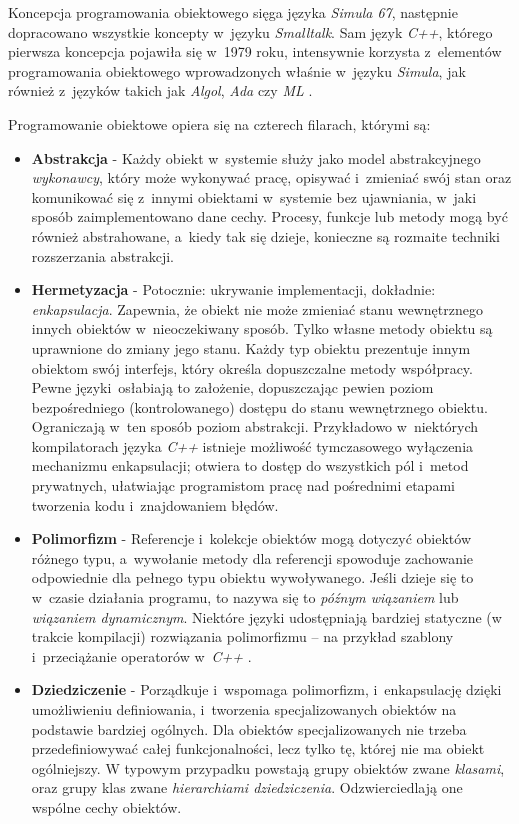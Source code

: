         Koncepcja programowania obiektowego sięga języka \textit{Simula 67}, następnie dopracowano wszystkie koncepty w~języku \textit{Smalltalk}. Sam język \textit{C++}, którego pierwsza koncepcja pojawiła się w~1979 roku, intensywnie korzysta z~elementów programowania obiektowego wprowadzonych właśnie w~języku \textit{Simula}, jak również z~języków takich jak \textit{Algol}, \textit{Ada} czy \textit{ML} \cite{CppStroustrup}.

        Programowanie obiektowe opiera się na czterech filarach, którymi są:
          \begin{itemize}
            \item \textbf{Abstrakcja} - Każdy obiekt w~systemie służy jako model abstrakcyjnego \textit{wykonawcy}, który może wykonywać pracę, opisywać i~zmieniać swój stan oraz komunikować się z~innymi obiektami w~systemie bez ujawniania, w~jaki sposób zaimplementowano dane cechy. Procesy, funkcje lub metody mogą być również abstrahowane, a~kiedy tak się dzieje, konieczne są rozmaite techniki rozszerzania abstrakcji.

            \item \textbf{Hermetyzacja} - Potocznie: ukrywanie implementacji, dokładnie: \textit{enkapsulacja}. Zapewnia, że obiekt nie może zmieniać stanu wewnętrznego innych obiektów w~nieoczekiwany sposób. Tylko własne metody obiektu są uprawnione do zmiany jego stanu. Każdy typ obiektu prezentuje innym obiektom swój interfejs, który określa dopuszczalne metody współpracy. Pewne języki~osłabiają to założenie, dopuszczając pewien poziom bezpośredniego (kontrolowanego) dostępu do stanu wewnętrznego obiektu. Ograniczają w~ten sposób poziom abstrakcji. Przykładowo w~niektórych kompilatorach języka \textit{C++} istnieje możliwość tymczasowego wyłączenia mechanizmu enkapsulacji; otwiera to dostęp do wszystkich pól i~metod prywatnych, ułatwiając programistom pracę nad pośrednimi etapami tworzenia kodu i~znajdowaniem błędów.

            \item \textbf{Polimorfizm} - Referencje i~kolekcje obiektów mogą dotyczyć obiektów różnego typu, a~wywołanie metody dla referencji spowoduje zachowanie odpowiednie dla pełnego typu obiektu wywoływanego. Jeśli dzieje się to w~czasie działania programu, to nazywa się to \textit{późnym wiązaniem} lub \textit{wiązaniem dynamicznym}. Niektóre języki udostępniają bardziej statyczne (w trakcie kompilacji) rozwiązania polimorfizmu – na przykład szablony i~przeciążanie operatorów w~\textit{C++} \cite{CppStroustrup}.

            \item \textbf{Dziedziczenie} - Porządkuje i~wspomaga polimorfizm, i~enkapsulację dzięki umożliwieniu definiowania, i~tworzenia specjalizowanych obiektów na podstawie bardziej ogólnych. Dla obiektów specjalizowanych nie trzeba przedefiniowywać całej funkcjonalności, lecz tylko tę, której nie ma obiekt ogólniejszy. W typowym przypadku powstają grupy obiektów zwane \textit{klasami}, oraz grupy klas zwane \textit{hierarchiami dziedziczenia}. Odzwierciedlają one wspólne cechy obiektów.
          \end{itemize}

